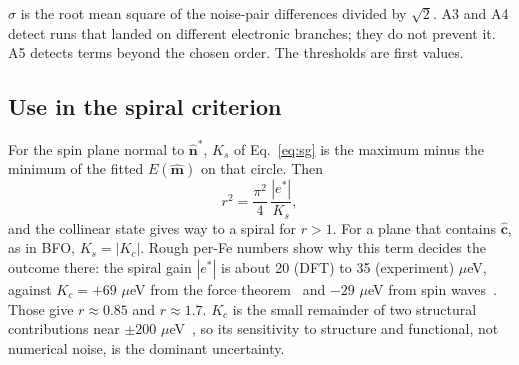 \documentclass[11pt,a4paper]{article}
\numberwithin{equation}{section}
\newcommand{\vct}[1]{\bm{#1}}
\newcommand{\nh}{\hat{\vct n}}
\begin{document}
$\sigma$ is the root mean square of the noise-pair differences divided by
$\sqrt2$. A3 and A4 detect runs that landed on different electronic branches;
they do not prevent it. A5 detects terms beyond the chosen order. The
thresholds are first values.

\subsection{Use in the spiral criterion}

For the spin plane normal to $\nh^*$, $K_s$ of Eq.~\eqref{eq:sg} is the maximum
minus the minimum of the fitted $E(\hat{\vct m})$ on that circle. Then
\begin{equation}\label{eq:r}
 \boxed{r^2=\frac{\pi^2}{4}\,\frac{|e^*|}{K_s},}
\end{equation}
and the collinear state gives way to a spiral for $r>1$. For a plane that
contains $\hat{\vct c}$, as in BFO, $K_s=|K_c|$. Rough per-Fe numbers show why
this term decides the outcome there: the spiral gain $|e^*|$ is about 20
(DFT) to 35 (experiment) $\mu$eV, against $K_c=+69$ $\mu$eV from the force
theorem~\cite{xu} and $-29$ $\mu$eV from spin waves~\cite{jeong}. Those give
$r\approx0.85$ and $r\approx1.7$. $K_c$ is the small remainder of two
structural contributions near $\pm200$ $\mu$eV~\cite{xu}, so its sensitivity to
structure and functional, not numerical noise, is the dominant uncertainty.
\end{document}
